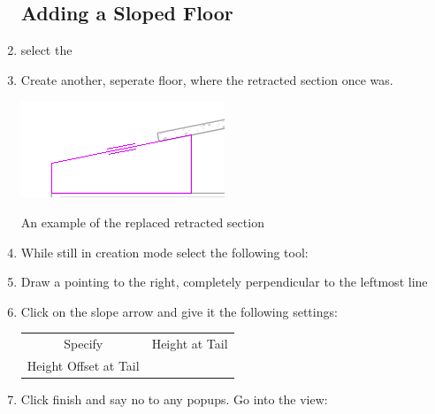 \documentclass{tufte-book} %
\begin{document}
\begin{enumerate}
	\subsection{Adding a Sloped Floor}
		\item select the 
		\item Create another, seperate floor, where the retracted section once was.
		
		\begin{marginfigure}
			\includegraphics[width=\linewidth]{revitentrydeckslopeinit.png}
			\caption{An example of the replaced retracted section}
			\label{fig:reventrydeckretractinit}
		\end{marginfigure}
		
		\item While still in creation mode select the following tool:\\ 
		\item Draw a  pointing to the right, completely perpendicular to the leftmost line
		\item Click on the slope arrow and give it the following settings:
		
		\newthought{}\begin{tabular}{c | c}
			Specify & Height at Tail\\
			Height Offset at Tail & \menu{-1'}\\
		\end{tabular}
		
		\item Click finish and say no to any popups. Go into the view: 
		

\end{enumerate}
\end{document}
